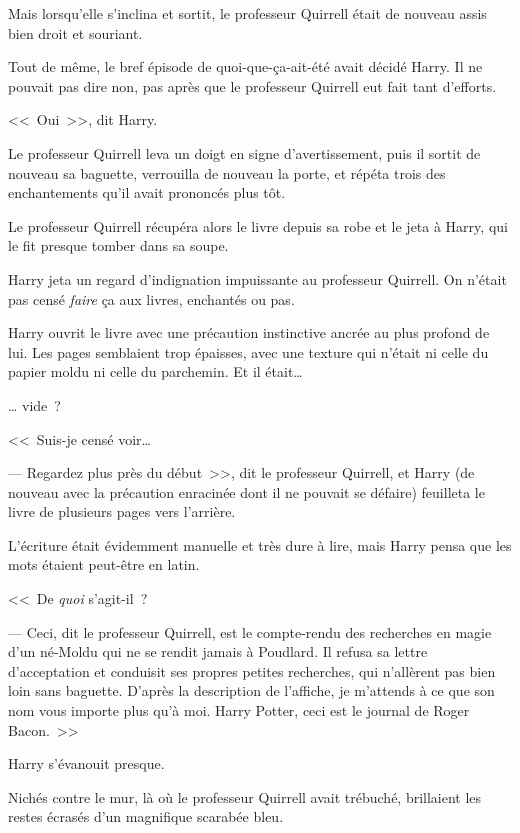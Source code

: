 Mais lorsqu'elle s'inclina et sortit, le professeur Quirrell était de nouveau assis bien droit et souriant.

Tout de même, le bref épisode de quoi-que-ça-ait-été avait décidé Harry. Il ne pouvait pas dire non, pas après que le professeur Quirrell eut fait tant d'efforts.

<<~Oui~>>, dit Harry.

Le professeur Quirrell leva un doigt en signe d'avertissement, puis il sortit de nouveau sa baguette, verrouilla de nouveau la porte, et répéta trois des enchantements qu'il avait prononcés plus tôt.

Le professeur Quirrell récupéra alors le livre depuis sa robe et le jeta à Harry, qui le fit presque tomber dans sa soupe.

Harry jeta un regard d'indignation impuissante au professeur Quirrell. On n'était pas censé \emph{faire} ça aux livres, enchantés ou pas.

Harry ouvrit le livre avec une précaution instinctive ancrée au plus profond de lui. Les pages semblaient trop épaisses, avec une texture qui n'était ni celle du papier moldu ni celle du parchemin. Et il était…

… vide~?

<<~Suis-je censé voir…

--- Regardez plus près du début~>>, dit le professeur Quirrell, et Harry (de nouveau avec la précaution enracinée dont il ne pouvait se défaire) feuilleta le livre de plusieurs pages vers l'arrière.

L'écriture était évidemment manuelle et très dure à lire, mais Harry pensa que les mots étaient peut-être en latin.

<<~De \emph{quoi} s'agit-il~?

--- Ceci, dit le professeur Quirrell, est le compte-rendu des recherches en magie d'un né-Moldu qui ne se rendit jamais à Poudlard. Il refusa sa lettre d'acceptation et conduisit ses propres petites recherches, qui n'allèrent pas bien loin sans baguette. D'après la description de l'affiche, je m'attends à ce que son nom vous importe plus qu'à moi. Harry Potter, ceci est le journal de Roger Bacon.~>>

Harry s'évanouit presque.

Nichés contre le mur, là où le professeur Quirrell avait trébuché, brillaient les restes écrasés d'un magnifique scarabée bleu.
